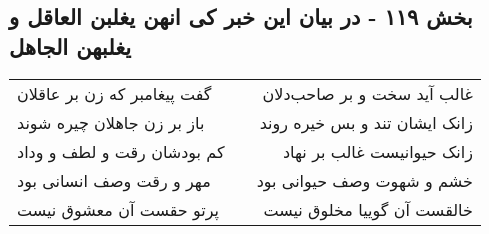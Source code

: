 \begin{center}
\section*{بخش ۱۱۹ - در بیان این خبر کی انهن یغلبن العاقل و یغلبهن الجاهل}
\label{sec:sh119}
\begin{longtable}{l p{0.5cm} r}
گفت پیغامبر که زن بر عاقلان
&&
غالب آید سخت و بر صاحب‌دلان
\\
باز بر زن جاهلان چیره شوند
&&
زانک ایشان تند و بس خیره روند
\\
کم بودشان رقت و لطف و وداد
&&
زانک حیوانیست غالب بر نهاد
\\
مهر و رقت وصف انسانی بود
&&
خشم و شهوت وصف حیوانی بود
\\
پرتو حقست آن معشوق نیست
&&
خالقست آن گوییا مخلوق نیست
\\
\end{longtable}
\end{center}
